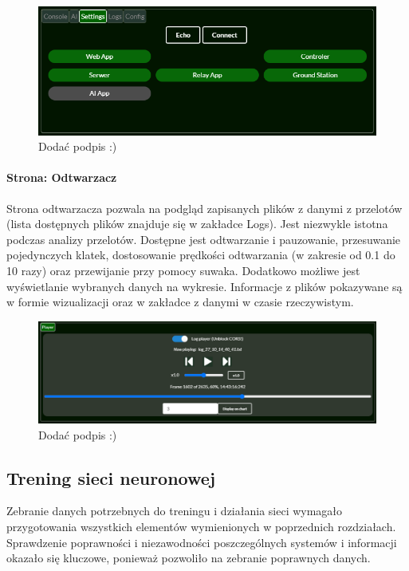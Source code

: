 \documentclass[12pt, a4paper]{article}
\begin{document}
 \begin{figure}[H]
    \centering
    \includegraphics[width=1\textwidth]{settings}
    \caption{Dodać podpis :)}
\end{figure}


\paragraph{Strona: Odtwarzacz}\mbox{}

Strona odtwarzacza pozwala na podgląd zapisanych plików z danymi z przelotów (lista dostępnych plików znajduje się w zakładce Logs). Jest niezwykle istotna podczas analizy przelotów. Dostępne jest odtwarzanie i pauzowanie, przesuwanie pojedynczych klatek, dostosowanie prędkości odtwarzania (w zakresie od 0.1 do 10 razy) oraz przewijanie przy pomocy suwaka. Dodatkowo możliwe jest wyświetlanie wybranych danych na wykresie. Informacje z plików pokazywane są w formie wizualizacji oraz w zakładce z danymi w czasie rzeczywistym.

 \begin{figure}[H]
    \centering
    \includegraphics[width=1\textwidth]{player}
    \caption{Dodać podpis :)}
\end{figure}

\FloatBarrier
\subsection{Trening sieci neuronowej}
Zebranie danych potrzebnych do treningu i działania sieci wymagało przygotowania wszystkich elementów wymienionych w poprzednich rozdziałach. Sprawdzenie poprawności i niezawodności poszczególnych systemów i informacji okazało się kluczowe, ponieważ pozwoliło na zebranie poprawnych danych. 
\end{document}
